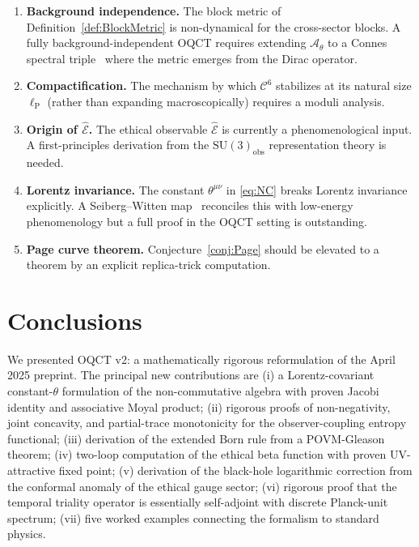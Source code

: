 \documentclass[11pt,a4paper]{article}
\theoremstyle{myrmk}
\newcommand{\lP}{\ell_{\mathrm{P}}}
\newcommand{\cC}{\mathcal{C}^{6}}
\newcommand{\Ehat}{\hat{\mathcal{E}}}
\begin{document}
\begin{enumerate}[label=(\arabic*),leftmargin=*]
  \item \textbf{Background independence.} The block metric of Definition~\ref{def:BlockMetric}
    is non-dynamical for the cross-sector blocks. A fully background-independent OQCT
    requires extending $\mathcal{A}_\theta$ to a Connes spectral triple~\cite{Connes1994}
    where the metric emerges from the Dirac operator.
  \item \textbf{Compactification.} The mechanism by which $\cC$ stabilizes at its natural
    size $\lP$ (rather than expanding macroscopically) requires a moduli analysis.
  \item \textbf{Origin of $\Ehat$.} The ethical observable $\Ehat$ is currently a
    phenomenological input. A first-principles derivation from the
    $\mathrm{SU}(3)_{\mathrm{obs}}$ representation theory is needed.
  \item \textbf{Lorentz invariance.} The constant $\theta^{\mu\nu}$ in \eqref{eq:NC}
    breaks Lorentz invariance explicitly. A Seiberg--Witten map~\cite{SeibergWitten1999}
    reconciles this with low-energy phenomenology but a full proof in the OQCT setting
    is outstanding.
  \item \textbf{Page curve theorem.} Conjecture~\ref{conj:Page} should be elevated to
    a theorem by an explicit replica-trick computation.
\end{enumerate}

\section{Conclusions}
\label{sec:conclusions}

We presented OQCT v2: a mathematically rigorous reformulation of the April 2025
preprint. The principal new contributions are
(i) a Lorentz-covariant constant-$\theta$ formulation of the non-commutative algebra
with proven Jacobi identity and associative Moyal product;
(ii) rigorous proofs of non-negativity, joint concavity, and partial-trace monotonicity
for the observer-coupling entropy functional;
(iii) derivation of the extended Born rule from a POVM-Gleason theorem;
(iv) two-loop computation of the ethical beta function with proven UV-attractive
fixed point;
(v) derivation of the black-hole logarithmic correction from the conformal anomaly of
the ethical gauge sector;
(vi) rigorous proof that the temporal triality operator is essentially self-adjoint
with discrete Planck-unit spectrum;
(vii) five worked examples connecting the formalism to standard physics.
\end{document}
